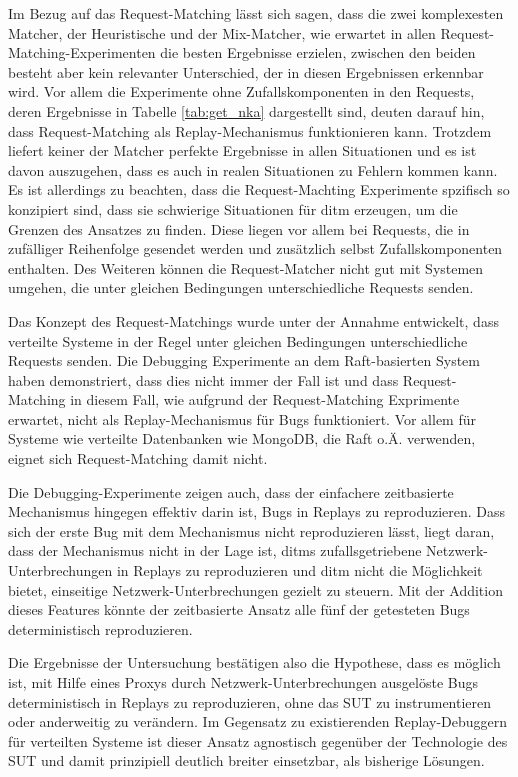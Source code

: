 \documentclass[12pt,a4paper]{report}
\begin{document}
Im Bezug auf das Request-Matching lässt sich sagen, dass die zwei komplexesten Matcher, der Heuristische und der Mix-Matcher, wie
erwartet in allen Request-Matching-Experimenten die besten Ergebnisse erzielen, zwischen den beiden besteht aber kein relevanter
Unterschied, der in diesen Ergebnissen erkennbar wird. Vor allem die Experimente ohne Zufallskomponenten in den Requests, deren
Ergebnisse in Tabelle \ref{tab:get_nka} dargestellt sind, deuten darauf hin, dass Request-Matching als Replay-Mechanismus
funktionieren kann. Trotzdem liefert keiner der Matcher perfekte Ergebnisse in allen Situationen und es ist davon auszugehen, dass
es auch in realen Situationen zu Fehlern kommen kann. Es ist allerdings zu beachten, dass die Request-Machting Experimente
spzifisch so konzipiert sind, dass sie schwierige Situationen für ditm erzeugen, um die Grenzen des Ansatzes zu finden. Diese
liegen vor allem bei Requests, die in zufälliger Reihenfolge gesendet werden und zusätzlich selbst Zufallskomponenten enthalten.
Des Weiteren können die Request-Matcher nicht gut mit Systemen umgehen, die unter gleichen Bedingungen unterschiedliche Requests
senden.

Das Konzept des Request-Matchings wurde unter der Annahme entwickelt, dass verteilte Systeme in der Regel unter gleichen
Bedingungen unterschiedliche Requests senden. Die Debugging Experimente an dem Raft-basierten System haben demonstriert, dass dies
nicht immer der Fall ist und dass Request-Matching in diesem Fall, wie aufgrund der Request-Matching Exprimente erwartet, nicht
als Replay-Mechanismus für Bugs funktioniert. Vor allem für Systeme wie verteilte Datenbanken wie MongoDB, die Raft o.Ä.
verwenden, eignet sich Request-Matching damit nicht.

Die Debugging-Experimente zeigen auch, dass der einfachere zeitbasierte Mechanismus hingegen effektiv darin ist, Bugs in Replays
zu reproduzieren. Dass sich der erste Bug mit dem Mechanismus nicht reproduzieren lässt, liegt daran, dass der Mechanismus nicht in der
Lage ist, ditms zufallsgetriebene Netzwerk-Unterbrechungen in Replays zu reproduzieren und ditm nicht die Möglichkeit bietet,
einseitige Netzwerk-Unterbrechungen gezielt zu steuern. Mit der Addition dieses Features könnte der zeitbasierte Ansatz alle fünf der
getesteten Bugs deterministisch reproduzieren.

Die Ergebnisse der Untersuchung bestätigen also die Hypothese, dass es möglich ist, mit Hilfe eines Proxys durch
Netzwerk-Unterbrechungen ausgelöste Bugs deterministisch in Replays zu reproduzieren, ohne das SUT zu instrumentieren oder
anderweitig zu verändern. Im Gegensatz zu existierenden Replay-Debuggern für verteilten Systeme ist dieser Ansatz agnostisch
gegenüber der Technologie des SUT und damit prinzipiell deutlich breiter einsetzbar, als bisherige Lösungen.
\end{document}
